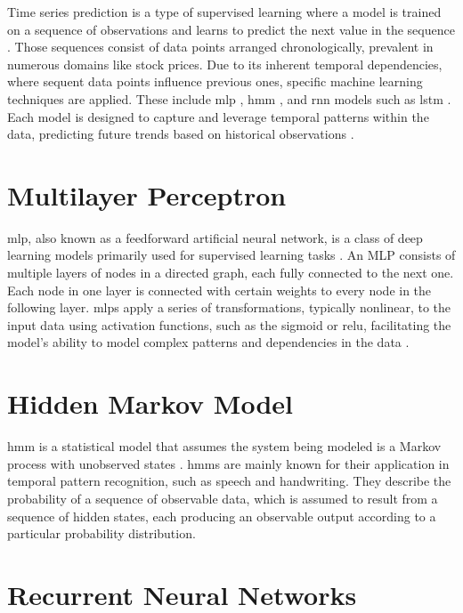 Time series prediction is a type of supervised learning where a model is trained on a sequence of observations and learns to predict the next value in the sequence \cite{brownleeDeepLearningTime}.
Those sequences consist of data points arranged chronologically, prevalent in numerous domains like stock prices.
Due to its inherent temporal dependencies, where sequent data points influence previous ones, specific machine learning techniques are applied.
These include \ac{mlp} \cite{mlp-backpropagation-rumelhart}, \ac{hmm} \cite{hmm-rabiner-1989}, and \ac{rnn} \cite{hopfield-rnn} models such as \ac{lstm} \cite{lstm-hochreiter}.
Each model is designed to capture and leverage temporal patterns within the data, predicting future trends based on historical observations \cite{neptune-ai}.


\section{Multilayer Perceptron}

\ac{mlp}, also known as a feedforward artificial neural network, is a class of deep learning models primarily used for supervised learning tasks \cite{mlp-backpropagation-rumelhart}.
An MLP consists of multiple layers of nodes in a directed graph, each fully connected to the next one.
Each node in one layer is connected with certain weights to every node in the following layer.
\acp{mlp} apply a series of transformations, typically nonlinear, to the input data using activation functions, such as the sigmoid or \ac{relu}, facilitating the model's ability to model complex patterns and dependencies in the data \cite{goodfellow_deep_2016}.

\section{Hidden Markov Model}

\ac{hmm} is a statistical model that assumes the system being modeled is a Markov process with unobserved states \cite{hmm-rabiner-1989}.
\acp{hmm} are mainly known for their application in temporal pattern recognition, such as speech and handwriting.
They describe the probability of a sequence of observable data, which is assumed to result from a sequence of hidden states, each producing an observable output according to a particular probability distribution.

\section{Recurrent Neural Networks}

